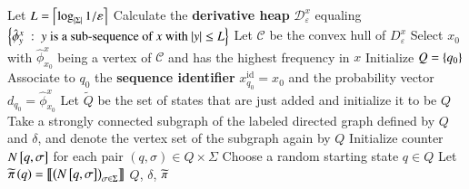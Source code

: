 \begin{algorithm}[!ht]
    Let $L=\left\lceil{\log_{\left\lvert \Sigma \right\rvert}1/\varepsilon}\right\rceil$\; \label{alg:GenL}
    Calculate the \textbf{derivative heap} $\mathcal{D}^{x}_{\varepsilon}$ equaling $\set{\hat{\phi}^{x}_y\ :\ \textrm{$y$ is a sub-sequence of $x$ with } |y|\leq L}$\;
    Let $\mathcal{C}$ be the convex hull of $D^{x}_{\varepsilon}$\; \label{alg:GenConv}
    Select $x_0$ with $\hat{\phi}^{x}_{x_0}$ being a vertex of $\mathcal{C}$ and has the highest frequency in $x$\; \label{alg:GenSyncSeq}
    Initialize $Q = \left\{ q_0 \right\}$\; \label{alg:GenStep2Start}
    Associate to $q_0$ the \textbf{sequence identifier} $x^{\textrm{id}}_{q_0} = x_0$ and the probability vector $d_{q_0} = \hat{\phi}^x_{x_0}$\;
    Let $\widetilde{Q}$ be the set of states that are just added and initialize it to be $Q$\;
    Take a strongly connected subgraph of the labeled directed graph defined by $Q$ and $\delta$, and denote the vertex set of the subgraph again by $Q$\;\label{alg:GenStep2End}
    Initialize counter $N\left[ q,\sigma \right]$ for each pair $(q, \sigma) \in Q\times\Sigma$\; \label{alg:GenIdenTransProbStart}
    Choose a random starting state $q\in Q$\;
    Let $\widetilde{\pi}\left( q \right) = \left\llbracket{\left( N\left[ q,\sigma \right] \right)_{\sigma\in\Sigma}}\right\rrbracket$\;\label{alg:GenIdenTransProbEnd}
    \Return $Q$, $\delta$, $\widetilde{\pi}$\;
    \caption{\algo}
    \label{alg:GenESeSS}
\end{algorithm}


